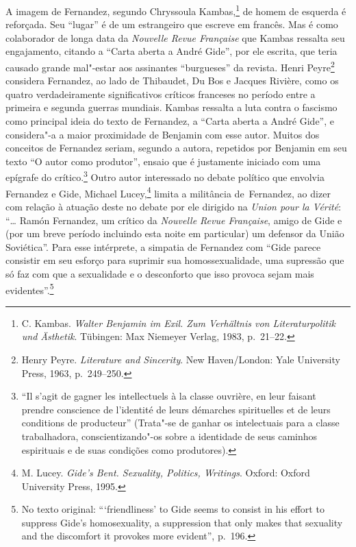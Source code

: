 A imagem de Fernandez, segundo Chryssoula Kambas,\footnote{C. Kambas.
  \emph{Walter Benjamin im Exil. Zum Verhältnis von Literaturpolitik und
  Ästhetik}. Tübingen: Max Niemeyer Verlag, 1983, p.~21--22.} de homem de
esquerda é reforçada. Seu ``lugar'' é de um estrangeiro que escreve em
francês. Mas é como colaborador de longa data da \emph{Nouvelle Revue
Française} que Kambas ressalta seu engajamento, citando a ``Carta aberta
a André Gide'', por ele escrita, que teria causado grande mal"-estar aos
assinantes ``burgueses'' da revista. Henri Peyre\footnote{Henry Peyre.
  \emph{Literature and Sincerity}. New Haven/London: Yale University
  Press, 1963, p.~249--250.} considera Fernandez, ao lado de Thibaudet, Du
Bos e Jacques Rivière, como os quatro verdadeiramente significativos
críticos franceses no período entre a primeira e segunda guerras
mundiais. Kambas ressalta a luta contra o fascismo como principal ideia do
texto de Fernandez, a ``Carta aberta a André Gide'', e considera"-a a
maior proximidade de Benjamin com esse autor. Muitos dos conceitos de
Fernandez seriam, segundo a autora, repetidos por Benjamin em seu texto
``O autor como produtor'', ensaio que é justamente iniciado com uma
epígrafe do crítico.\footnote{``Il s'agit de gagner les intellectuels à
  la classe ouvrière, en leur faisant prendre conscience de l'identité
  de leurs démarches spirituelles et de leurs conditions de producteur''
  (Trata"-se de ganhar os intelectuais para a classe trabalhadora,
  conscientizando"-os sobre a identidade de seus caminhos espirituais e de
  suas condições como produtores).} Outro autor interessado no debate
político que envolvia Fernandez e Gide, Michael Lucey,\footnote{M.
  Lucey. \emph{Gide's Bent. Sexuality, Politics, Writings}. Oxford:
  Oxford University Press, 1995.} limita a militância de~Fernandez, ao
dizer com relação à atuação deste no debate por ele dirigido na \emph{Union
pour la Vérité}: ``\ldots{} Ramón Fernandez, um crítico da \emph{Nouvelle
Revue Française}, amigo de Gide e (por um breve período incluindo esta
noite em particular) um defensor da União Soviética''. Para esse
intérprete, a simpatia de Fernandez com ``Gide parece consistir em seu
esforço para suprimir sua homossexualidade, uma supressão que só faz com
que a sexualidade e o desconforto que isso provoca sejam mais
evidentes''.\footnote{No texto original: ```friendliness' to Gide seems
  to consist in his effort to suppress Gide's homosexuality, a
  suppression that only makes that sexuality and the discomfort it
  provokes more evident'', p.~196.}

